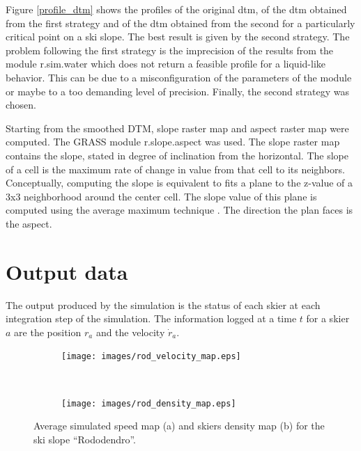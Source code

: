\documentclass[12pt,a4paper,twoside]{book}
\begin{document}
Figure \ref{profile_dtm} shows the profiles of the original dtm, of the dtm obtained from the first strategy and of the dtm obtained from the second for a particularly critical point on a ski slope. The best result is given by the second strategy. The problem following the first strategy is the imprecision of the results from the module r.sim.water which does not return a feasible profile for a liquid-like behavior. This can be due to a misconfiguration of the parameters of the module or maybe to a too demanding level of precision. Finally, the second strategy was chosen.

Starting from the smoothed DTM, slope raster map and aspect raster map were computed. The GRASS module r.slope.aspect was used. The slope raster map contains the slope, stated in degree of inclination from the horizontal. The slope of a cell is the maximum rate of change in value from that cell to its neighbors. Conceptually, computing the slope is equivalent to fits a plane to the z-value of a 3x3 neighborhood around the center cell. The slope value of this plane is computed using the average maximum technique \cite{bur2009}. The direction the plan faces is the aspect.

\section{Output data}\label{output_data}
The output produced by the simulation is the status of each skier at each integration step of the simulation. The information logged at a time $t$ for a skier $a$ are the position $r_a$ and the velocity $\dot{r}_a$.

\begin{figure}[!h]
        \centering
        \begin{subfigure}[b]{0.5\textwidth}
                \centering
                \texttt{[image: images/rod\_velocity\_map.eps]}
                \caption{}\label{rododendro_vel}
        \end{subfigure}%
        ~ %
        \begin{subfigure}[b]{0.5\textwidth}
                \centering
                \texttt{[image: images/rod\_density\_map.eps]}
                \caption{}\label{rododendro_den}
        \end{subfigure}
        \caption{Average simulated speed map (a) and skiers density map (b) for the ski slope ``Rododendro''.}\label{rododendro}
\end{figure}
\end{document}
